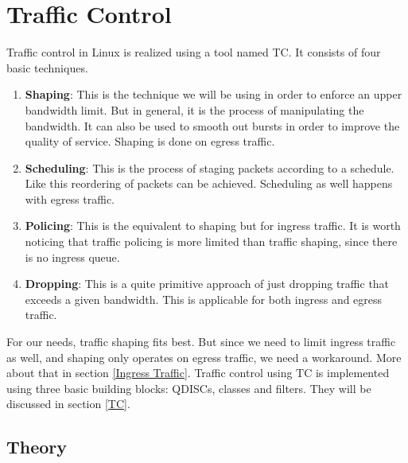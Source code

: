 \chapter{Traffic Control}
Traffic control in Linux is realized using a tool named \acs{TC}. It consists of four basic techniques.

\begin{enumerate}
\item \textbf{Shaping}: This is the technique we will be using in order to enforce an upper bandwidth limit. But in general, it is the process of manipulating the bandwidth. It can also be used to smooth out bursts in order to improve the quality of service. Shaping is done on egress traffic.

\item \textbf{Scheduling}: This is the process of staging packets according to a schedule. Like this reordering of packets can be achieved. Scheduling as well happens with egress traffic.

\item \textbf{Policing}: This is the equivalent to shaping but for ingress traffic. It is worth noticing that traffic policing is more limited than traffic shaping, since there is no ingress queue.

\item \textbf{Dropping}: This is a quite primitive approach of just dropping traffic that exceeds a given bandwidth. This is applicable for both ingress and egress traffic.
\end{enumerate}

For our needs, traffic shaping fits best. But since we need to limit ingress traffic as well, and shaping only operates on egress traffic, we need a workaround. More about that in section  \ref{Ingress Traffic}. Traffic control using \acs{TC} is implemented using three basic building blocks: \acp{QDISC}, classes and filters. They will be discussed in section \ref{TC}.

\section{Theory}
